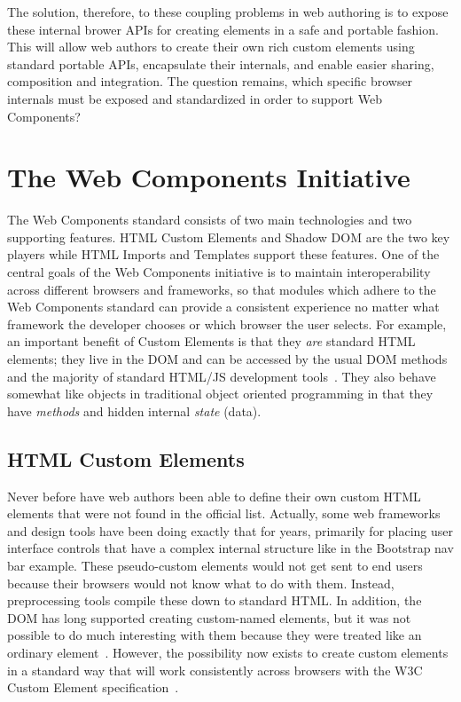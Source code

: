 The solution, therefore, to these coupling problems in web authoring is to expose these internal brower APIs for creating elements in a safe and portable fashion. 
This will allow web authors to create their own rich custom elements using standard portable APIs, encapsulate their internals, and enable easier sharing, composition and integration.
The question remains, which specific browser internals must be exposed and standardized in order to support Web Components?

\section{The Web Components Initiative}

The Web Components standard consists of two main technologies and two supporting features. 
HTML Custom Elements and Shadow DOM are the two key players while HTML Imports and Templates support these features. 
One of the central goals of the Web Components initiative is to maintain interoperability across different browsers and frameworks, 
so that modules which adhere to the Web Components standard can provide a consistent experience no matter what framework the developer chooses or which browser the user selects.
For example, an important benefit of Custom Elements is that they \textit{are} standard HTML elements; they live in the DOM and can be accessed by the usual DOM methods and the majority of standard HTML/JS development tools~\cite{penades2015}.
They also behave somewhat like objects in traditional object oriented programming in that 
they have \textit{methods} and hidden internal \textit{state} (data).

\subsection{HTML Custom Elements}
Never before have web authors been able to define their own custom HTML elements that were not found in the official list.
Actually, some web frameworks and design tools have been doing exactly that for years, primarily for placing user interface controls that have a complex internal structure like in the Bootstrap nav bar example.
These pseudo-custom elements would not get sent to end users because their browsers would not know what to do with them.
Instead, preprocessing tools compile these down to standard HTML.
In addition, the DOM has long supported creating custom-named elements, but it was not possible to do much interesting with them because they were treated like an ordinary 
 element~\cite{w3ccontributors2015-b}.
However, the possibility now exists to create custom elements in a standard way that will work consistently across browsers with the W3C Custom Element
specification~\cite{w3ccontributors2015-b}. 


